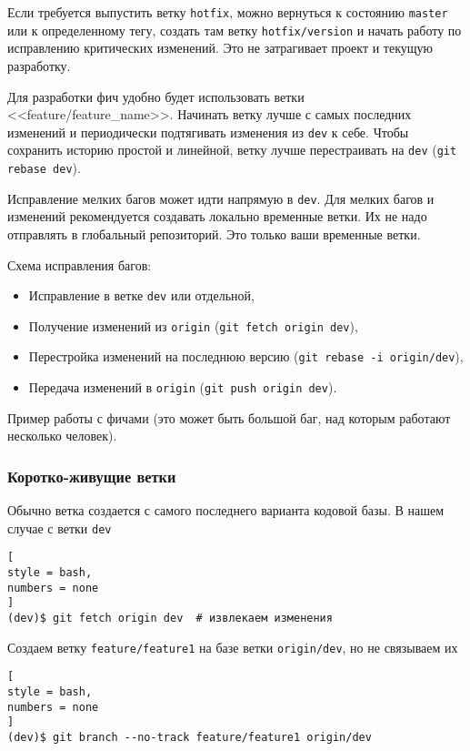 \documentclass[%
	11pt,
	a4paper,
	utf8,
		]{article}
\begin{document}
Если требуется выпустить ветку \texttt{hotfix}, можно вернуться к состоянию \texttt{master} или к определенному тегу, создать там ветку \texttt{hotfix/version} и начать работу по исправлению критических изменений. Это не затрагивает проект и текущую разработку.

Для разработки фич удобно будет использовать ветки <<feature/feature\_name>>. Начинать ветку лучше с самых последних изменений и периодически подтягивать изменения из \texttt{dev} к себе. Чтобы сохранить историю простой и линейной, ветку лучше перестраивать на \texttt{dev} (\texttt{git rebase dev}).

Исправление мелких багов может идти напрямую в \texttt{dev}. Для мелких багов и изменений рекомендуется создавать локально временные ветки. Их не надо отправлять в глобальный репозиторий. Это только ваши временные ветки.

Схема исправления багов:
\begin{itemize}
	\item Исправление в ветке \texttt{dev} или отдельной,
	
	\item Получение изменений из \texttt{origin} (\texttt{git fetch origin dev}),
	
	\item Перестройка изменений на последнюю версию (\texttt{git rebase -i origin/dev}),
	
	\item Передача изменений в \texttt{origin} (\texttt{git push origin dev}).
\end{itemize}

Пример работы с фичами (это может быть большой баг, над которым работают несколько человек).

\subsubsection{Коротко-живущие ветки}

Обычно ветка создается с самого последнего варианта кодовой базы. В нашем случае с ветки \texttt{dev}
\begin{lstlisting}[
style = bash,
numbers = none
]
(dev)$ git fetch origin dev  # извлекаем изменения
\end{lstlisting}

Создаем ветку \texttt{feature/feature1} на базе ветки \texttt{origin/dev}, но не связываем их
\begin{lstlisting}[
style = bash,
numbers = none
]
(dev)$ git branch --no-track feature/feature1 origin/dev
\end{lstlisting}
\end{document}

